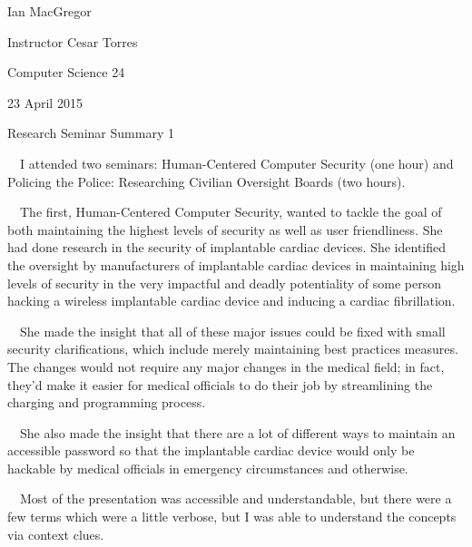 \documentclass{article}
\title{}
\begin{document}
Ian MacGregor

Instructor Cesar Torres

Computer Science 24

23 April 2015

\begin{center}
Research Seminar Summary 1
\end{center}

\ \ I attended two seminars: Human-Centered Computer Security (one hour) and Policing the Police: Researching Civilian Oversight Boards (two hours). 

\ \ The first, Human-Centered Computer Security, wanted to tackle the goal of both maintaining the highest levels of security as well as user friendliness. She had done research in the security of implantable cardiac devices. She identified the oversight by manufacturers of implantable cardiac devices in maintaining high levels of security in the very impactful and deadly potentiality of some person hacking a wireless implantable cardiac device and inducing a cardiac fibrillation. 

\ \ She made the insight that all of these major issues could be fixed with small security clarifications, which include merely maintaining best practices measures. The changes would not require any major changes in the medical field; in fact, they'd make it easier for medical officials to do their job by streamlining the charging and programming process. 

\ \ She also made the insight that there are a lot of different ways to maintain an accessible password so that the implantable cardiac device would only be hackable by medical officials in emergency circumstances and otherwise. 

\ \ Most of the presentation was accessible and understandable, but there were a few terms which were a little verbose, but I was able to understand the concepts via context clues. 
\end{document}
